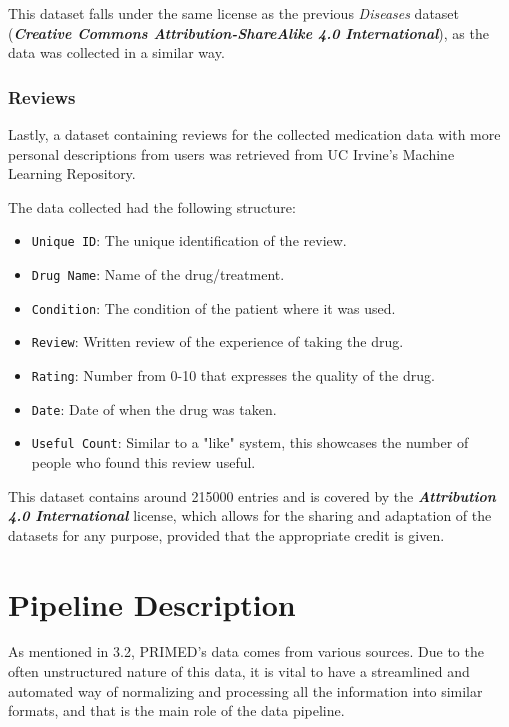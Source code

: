 \documentclass[sigconf]{acmart}
\begin{document}
This dataset falls under the same license as the previous \textit{Diseases} dataset (\textit{\textbf{Creative Commons Attribution-ShareAlike 4.0 International}}), as the data was collected in a similar way.

\subsubsection{Reviews}

Lastly, a dataset containing reviews for the collected medication data with more personal descriptions from users\cite{reviews_dataset} was retrieved from UC Irvine's Machine Learning Repository\cite{irvine}.

The data collected had the following structure:
\begin{itemize}
	\item {\texttt{Unique ID}}: The unique identification of the review.
	\item {\texttt{Drug Name}}: Name of the drug/treatment.
	\item {\texttt{Condition}}: The condition of the patient where it was used.
	\item {\texttt{Review}}: Written review of the experience of taking the drug.
	\item {\texttt{Rating}}: Number from 0-10 that expresses the quality of the drug.
    \item {\texttt{Date}}: Date of when the drug was taken.
    \item {\texttt{Useful Count}}: Similar to a "like" system, this showcases the number of people who found this review useful.
\end{itemize}

This dataset contains around 215000 entries and is covered by the \textit{\textbf{Attribution 4.0 International}}\cite{ccfour} license, which allows for the sharing and adaptation of the datasets for any purpose, provided that the appropriate credit is given.

\section{Pipeline Description}

As mentioned in 3.2, PRIMED's data comes from various sources. Due to the often unstructured nature of this data, it is vital to have a streamlined and automated way of normalizing and processing all the information into similar formats, and that is the main role of the data pipeline.
\end{document}
